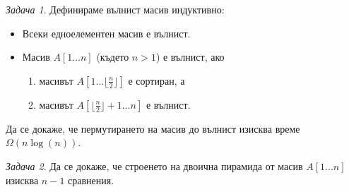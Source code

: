 \documentclass{article}
\theoremstyle{definition}
\theoremstyle{plain}
\theoremstyle{remark}
\newtheorem{problem}{Задача}
\theoremstyle{definition}
\begin{document}
\begin{problem}
Дефинираме вълнист масив индуктивно:
\begin{itemize}
    \item Всеки едноелементен масив е вълнист.
    \item Масив $A[1 \dots n]$ (където $n > 1$) е вълнист, ако
          \begin{enumerate}
              \item масивът $A[1 \dots \lfloor \frac{n}{2} \rfloor]$ е сортиран, а
              \item масивът $A[\lfloor \frac{n}{2} \rfloor + 1 \dots n]$ е вълнист.
          \end{enumerate}
\end{itemize}
Да се докаже, че пермутирането на масив до вълнист изисква време $\Omega(n \log(n))$.
\end{problem}

\begin{problem}
Да се докаже, че строенето на двоична пирамида от масив $A[1 \dots n]$ изисква $n - 1$ сравнения.
\end{problem}
\end{document}

